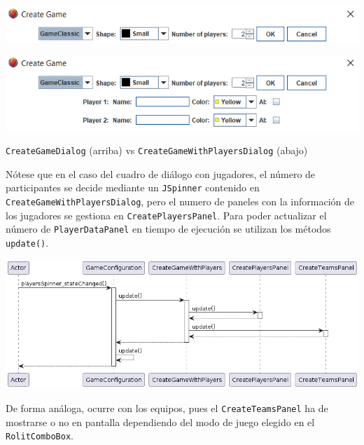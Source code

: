 \documentclass[12pt,a4paper,openright]{book}
\theoremstyle{break}
\begin{document}
\begin{center}
\includegraphics[scale=0.65]{create-game-sprint6.png}
\end{center}

\begin{center}
\includegraphics[scale=0.65]{create-game-players-sprint6.png}

\texttt{CreateGameDialog} (arriba) vs \texttt{CreateGameWithPlayersDialog} (abajo)
\end{center}

Nótese que en el caso del cuadro de diálogo con jugadores, el número de participantes se decide mediante un \texttt{JSpinner} contenido en \texttt{CreateGameWithPlayersDialog}, pero el numero de paneles con la información de los jugadores se gestiona en \texttt{CreatePlayersPanel}. Para poder actualizar el número de \texttt{PlayerDataPanel} en tiempo de ejecución se utilizan los métodos \texttt{update()}.
\begin{center}
\includegraphics[scale=0.41]{updateGameConfig.png}
\end{center}

De forma análoga, ocurre con los equipos, pues el \texttt{CreateTeamsPanel} ha de mostrarse o no en pantalla dependiendo del modo de juego elegido en el \texttt{RolitComboBox}.
\newpage
\end{document}
